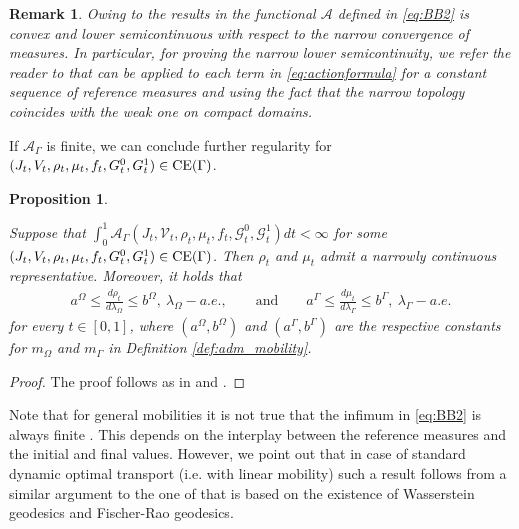 \documentclass{article}
\def\calA{{\mathcal A}} \def\calB{{\mathcal B}} \def\calC{{\mathcal C}}
\newtheorem{proposition}[theorem]{Proposition}
\newtheorem{remark}[theorem]{Remark}
\begin{document}
\begin{remark}
\label{rem:lsc}
     Owing to the results in \cite{Dolbeault_2008,Lisini2010} the functional $\calA$ defined in \eqref{eq:BB2} is convex and lower semicontinuous with respect to the narrow convergence of measures. In particular, for proving the narrow lower semicontinuity, we refer the reader to \cite[Lemma 3.9]{Dolbeault_2008} that can be applied to each term in \eqref{eq:actionformula} for a constant sequence of reference measures and using the fact that the narrow topology coincides with the weak one on compact domains.
\end{remark}

If $\calA_\Gamma$ is finite, we can conclude further regularity for $(J_t, V_t, \rho_t, \mu_t, f_t, G_t^0, G^1_t) \in {\rm CE}(\Gamma)$. 

\begin{proposition}\label{ExistenceDensities}

    Suppose that $\int_0^1 \calA_\Gamma(J_t,\mathcal{V}_t,\rho_t,\mu_t,f_t, \mathcal{G}^0_t, \mathcal{G}^1_t) dt< \infty$ for some $(J_t, V_t, \rho_t, \mu_t, f_t, G_t^0, G^1_t) \in {\rm CE}(\Gamma)$. Then $\rho_t$ and $\mu_t$  admit a narrowly continuous representative.
    Moreover, it holds that 
        \begin{align}
            a^\Omega \le \frac{d\rho_t}{d\lambda_\Omega} \le b^\Omega,\  \lambda_\Omega-a.e.,\qquad \text{and} \qquad  a^\Gamma \le \frac{d\mu_t}{d\lambda_\Gamma} \le  b^\Gamma, \ \lambda_\Gamma-a.e.
        \end{align}
        for every $t \in [0,1]$, where $(a^\Omega,b^\Omega)$ and $(a^\Gamma, b^\Gamma)$ are the respective constants for $m_\Omega$ and $m_\Gamma$ in Definition \ref{def:adm_mobility}. 
        \end{proposition}
\begin{proof}
 The proof follows as in \cite[Section 2, Definition 3]{Lisini2010} and \cite[Section 2, Lemma 1]{Lisini2010}.
\end{proof}

Note that for general mobilities it is not true that the infimum in \eqref{eq:BB2} is always finite \cite{Dolbeault_2008}. This depends on the interplay between the reference measures and the initial and final values. However, we point out that in case of standard dynamic optimal transport (i.e. with linear mobility) such a result follows from a similar argument to the one of \cite[Lemma 3.7]{monsaingeon2021new} that is based on the existence of Wasserstein geodesics and Fischer-Rao geodesics.
\end{document}
